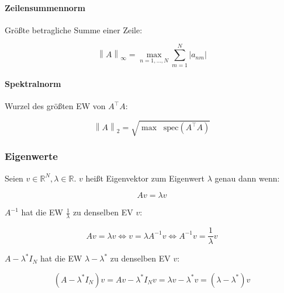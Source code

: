 \documentclass[a4paper, 14pt]{article}
\newcommand{\norm}[1]{\left\lVert#1\right\rVert}
\newcommand*\Spektrum{\mathop{}\!\mathrm{spec}}
\begin{document}
	\paragraph{Zeilensummennorm}

	Größte betragliche Summe einer Zeile:

	\begin{equation}
		\norm{A}_\infty = \max_{n = 1, ..., N}{\sum_{m = 1}^N{|a_{nm}|}}
	\end{equation}

	\paragraph{Spektralnorm}

	Wurzel des größten EW von $A^\top A$:

	\begin{equation}
		\norm{A}_2 = \sqrt{\max \Spektrum(A^\top A)}
	\end{equation}

	\subsubsection{Eigenwerte}

	Seien $v \in \mathbb{R}^N, \lambda \in \mathbb{R}$. $v$ heißt Eigenvektor zum Eigenwert $\lambda$ genau dann wenn:

	\begin{equation}
		A v = \lambda v
	\end{equation}

	$A^{-1}$ hat die EW $\frac{1}{\lambda}$ zu denselben EV $v$:

	\begin{equation}
		A v = \lambda v \Leftrightarrow v = \lambda A^{-1} v \Leftrightarrow A^{-1} v = \frac{1}{\lambda} v
	\end{equation}

	$A - \lambda^* I_N$ hat die EW $\lambda - \lambda^*$ zu denselben EV $v$:

	\begin{equation}
		(A - \lambda^* I_N) v = A v - \lambda^* I_N v = \lambda v - \lambda^* v = (\lambda - \lambda^*)v
	\end{equation}
\end{document}
